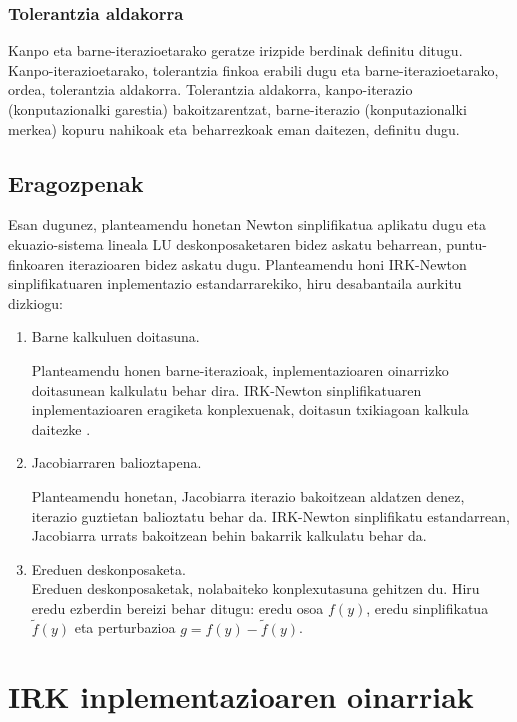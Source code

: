 \subsubsection*{Tolerantzia aldakorra}

Kanpo eta barne-iterazioetarako geratze irizpide berdinak definitu ditugu. Kanpo-iterazioetarako, tolerantzia finkoa erabili dugu eta barne-iterazioetarako, ordea, tolerantzia aldakorra. Tolerantzia aldakorra, kanpo-iterazio (konputazionalki garestia) bakoitzarentzat, barne-iterazio (konputazionalki merkea) kopuru nahikoak eta beharrezkoak eman daitezen, definitu dugu.     
 

\subsection*{Eragozpenak}
Esan dugunez, planteamendu honetan Newton sinplifikatua aplikatu dugu eta ekuazio-sistema lineala LU deskonposaketaren bidez askatu beharrean, puntu-finkoaren iterazioaren bidez askatu dugu. Planteamendu honi IRK-Newton sinplifikatuaren inplementazio estandarrarekiko, hiru desabantaila aurkitu dizkiogu: 
\begin{enumerate}
\item Barne kalkuluen doitasuna. 

Planteamendu honen barne-iterazioak, inplementazioaren oinarrizko doitasunean kalkulatu behar dira.
IRK-Newton sinplifikatuaren inplementazioaren eragiketa konplexuenak, doitasun txikiagoan kalkula daitezke \cite{Baboulin20092526}. 

\item Jacobiarraren balioztapena.

Planteamendu honetan, Jacobiarra iterazio bakoitzean aldatzen denez, iterazio guztietan balioztatu behar da.
IRK-Newton sinplifikatu estandarrean, Jacobiarra urrats bakoitzean behin bakarrik kalkulatu behar da. 

\item Ereduen deskonposaketa.\\
Ereduen deskonposaketak, nolabaiteko konplexutasuna gehitzen du. Hiru eredu ezberdin bereizi behar ditugu: eredu osoa $f(y)$, eredu sinplifikatua $\tilde{f}(y)$ eta perturbazioa  $g=f(y)-\tilde{f}(y)$. 
\end{enumerate}

\section{IRK inplementazioaren oinarriak}


